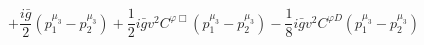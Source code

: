 %
\begin{dmath*}
%
  +  \frac{i {\bar g}{}}{2} \left(p_1^{\mu_3} - p_2^{\mu_3}\right)  +  \frac{1}{2} i {\bar g}{} v^2C^{ \varphi  \Box} \left(p_1^{\mu_3} - p_2^{\mu_3}\right)  -  \frac{1}{8} i {\bar g}{} v^2C^{ \varphi  D} \left(p_1^{\mu_3} - p_2^{\mu_3}\right)
%
\end{dmath*}
%
